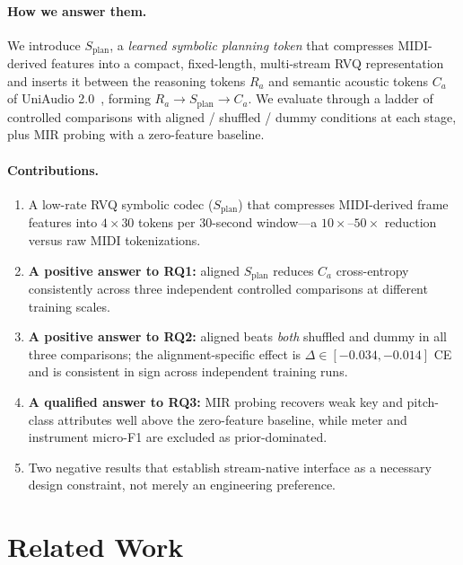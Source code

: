 \documentclass[11pt]{article}
\newcommand{\splan}{$S_{\mathrm{plan}}$}
\newcommand{\splanmath}{S_{\mathrm{plan}}}
\newcommand{\Ramath}{R_a}
\newcommand{\Camath}{C_a}
\begin{document}
\paragraph{How we answer them.}
We introduce \splan{}, a \emph{learned symbolic planning token} that compresses
MIDI-derived features into a compact, fixed-length, multi-stream RVQ representation and
inserts it between the reasoning tokens $\Ramath$ and semantic acoustic tokens $\Camath$
of UniAudio 2.0~\citep{yang2026uniaudio2}, forming $\Ramath \to \splanmath \to \Camath$.
We evaluate through a ladder of controlled comparisons with aligned / shuffled / dummy
conditions at each stage, plus MIR probing with a zero-feature baseline.

\paragraph{Contributions.}
\begin{enumerate}
  \item A low-rate RVQ symbolic codec (\splan{}) that compresses MIDI-derived frame
    features into $4 \times 30$ tokens per 30-second window---a $10\times$--$50\times$
    reduction versus raw MIDI tokenizations.
  \item \textbf{A positive answer to RQ1:} aligned \splan{} reduces $\Camath$
    cross-entropy consistently across three independent controlled comparisons at
    different training scales.
  \item \textbf{A positive answer to RQ2:} aligned beats \emph{both} shuffled and
    dummy in all three comparisons; the alignment-specific effect is
    $\Delta\in[-0.034, -0.014]$ CE and is consistent in sign across independent training runs.
  \item \textbf{A qualified answer to RQ3:} MIR probing recovers weak key and
    pitch-class attributes well above the zero-feature baseline, while meter and
    instrument micro-F1 are excluded as prior-dominated.
  \item Two negative results that establish stream-native interface as a necessary
    design constraint, not merely an engineering preference.
\end{enumerate}

\section{Related Work}
\end{document}
